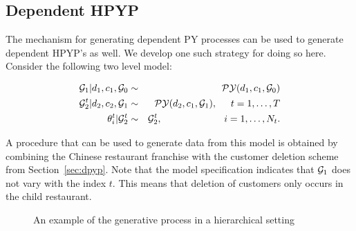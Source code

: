 \subsection{Dependent HPYP}
\label{sec:dhpyp}

The mechanism for generating dependent PY processes can be used to generate dependent HPYP's as well.  We develop one such strategy for doing so here.  Consider the following two level model: 

\begin{eqnarray}
\G_1 | d_1, c_1, \G_0 &\sim& \PY(d_1, c_1, \G_0)  \label{fig:dhpyp} \\
\G_2^t | d_2, c_2, \G_1&\sim& \PY(d_2, c_1, \G_1), \hspace{.5cm} t = 1,\dots, T \nonumber\\
 \theta^t_i | \G_2^t &\sim& \G_2^t ,\hspace{2.27cm} i = 1,\dots, N_t. \nonumber
\end{eqnarray}

A procedure that can be used to generate data from this model is obtained by combining the Chinese restaurant franchise with the customer deletion scheme from Section~\ref{sec:dpyp}.  Note that the model specification indicates that $\G_1$ does not vary with the index $t$.  This means that deletion of customers only occurs in the child restaurant.

\begin{figure}[t] 
	\begin{center}
		\caption{An example of the generative process in a hierarchical setting}
		\label{figVHPY}
	\end{center} 
\end{figure} 

